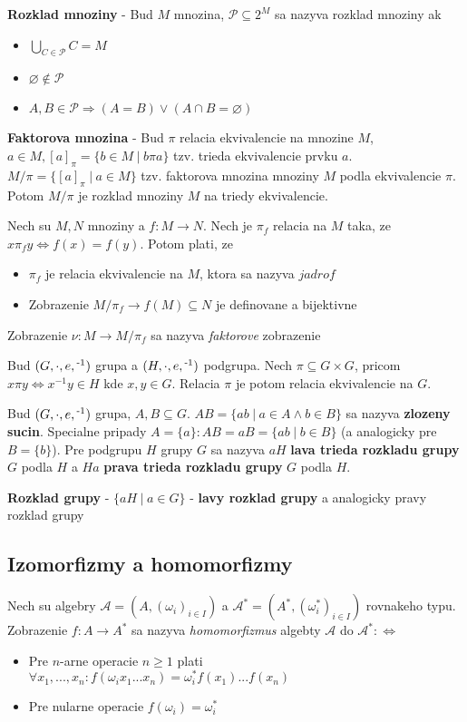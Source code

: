 \documentclass[12pt]{article}
\newcommand{\pipesep}{\hspace{3pt} \vert \hspace{3pt}}
\begin{document}
\textbf{Rozklad mnoziny} - Bud $M$ mnozina, $\mathcal{P} \subseteq 2^{M}$ sa nazyva rozklad mnoziny ak
\begin{itemize}
	\item $\bigcup_{C \in \mathcal{P}} C = M$
	\item $\varnothing \not\in \mathcal{P}$
	\item $A,B \in \mathcal{P} \Rightarrow (A = B) \lor (A \cap B = \varnothing)$
\end{itemize}

\textbf{Faktorova mnozina} - Bud $\pi$ relacia ekvivalencie na mnozine $M$, $a \in M, [a]_{\pi} = \{b \in M \pipesep b\pi a\}$
tzv. trieda ekvivalencie prvku $a$. $M/\pi = \{[a]_{\pi} \pipesep a \in M\}$ tzv. faktorova mnozina mnoziny $M$ podla ekvivalencie
$\pi$. Potom $M/\pi$ je rozklad mnoziny $M$ na triedy ekvivalencie.

\newpage
Nech su $M,N$ mnoziny a $f: M \to N$. Nech je $\pi_{f}$ relacia na $M$ taka, ze
$x\pi_{f}y \Leftrightarrow f(x) = f(y)$. Potom plati, ze
\begin{itemize}
	\item $\pi_{f}$ je relacia ekvivalencie na $M$, ktora sa nazyva $jadro f$
	\item Zobrazenie $M/\pi_{f} \to f(M) \subseteq N$ je definovane a bijektivne
\end{itemize}
Zobrazenie $\nu: M \to M/\pi_{f}$ sa nazyva \emph{faktorove} zobrazenie

\vspace{0.5cm}

Bud $(G,\cdot,e,\textsuperscript{-1})$ grupa a $(H,\cdot,e,\textsuperscript{-1})$ podgrupa.
Nech $\pi \subseteq G \times G$, pricom $x\pi y \Leftrightarrow x^{-1}y \in H$ kde $x,y \in G$.
Relacia $\pi$ je potom relacia ekvivalencie na $G$.

Bud $(G,\cdot,e,\textsuperscript{-1})$ grupa, $A,B \subseteq G$. $AB = \{ab \pipesep a \in A \land b \in B\}$
sa nazyva \textbf{zlozeny sucin}. Specialne pripady $A = \{a\}: AB = aB = \{ab \pipesep b \in B\}$ (a analogicky
pre $B = \{b\}$). Pre podgrupu $H$ grupy $G$ sa nazyva $aH$ \textbf{lava trieda rozkladu grupy} $G$ podla $H$ a
$Ha$ \textbf{prava trieda rozkladu grupy} $G$ podla $H$.

\textbf{Rozklad grupy} - $\{aH \pipesep a \in G\}$ - \textbf{lavy rozklad grupy} a analogicky pravy rozklad grupy

\subsection{Izomorfizmy a homomorfizmy}
Nech su algebry $\mathcal{A} = (A,(\omega_{i})_{i \in I})$ a $\mathcal{A}^{*} = (A^{*},(\omega^{*}_{i})_{i \in I})$
rovnakeho typu. Zobrazenie $f: A \to A^{*}$ sa nazyva \emph{homomorfizmus} algebty $\mathcal{A}$ do $\mathcal{A}^{*}: \Leftrightarrow$
\begin{itemize}
	\item Pre $n$-arne operacie $n \ge 1$ plati $\forall x_{1},...,x_{n}: f(\omega_{i}x_{1}...x_{n}) = \omega^{*}_{i}f(x_{1})...f(x_{n})$
	\item Pre nularne operacie $f(\omega_{i}) = \omega^{*}_{i}$
\end{itemize}
\end{document}
